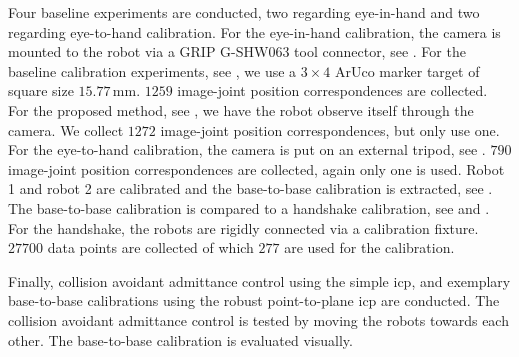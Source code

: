 Four baseline experiments are conducted, two regarding eye-in-hand and two regarding eye-to-hand calibration. For the eye-in-hand calibration, the camera is mounted to the robot via a GRIP G-SHW063 tool connector, see . For the baseline calibration experiments, see , we use a $3\times4$ ArUco marker target of square size $15.77\,\text{mm}$. $1259$ image-joint position correspondences are collected. For the proposed method, see , we have the robot observe itself through the camera. We collect $1272$ image-joint position correspondences, but only use one. For the eye-to-hand calibration, the camera is put on an external tripod, see . $790$ image-joint position correspondences are collected, again only one is used. Robot 1 and robot 2 are calibrated and the base-to-base calibration is extracted, see . The base-to-base calibration is compared to a handshake calibration, see  and . For the handshake, the robots are rigidly connected via a calibration fixture. $27700$ data points are collected of which $277$ are used for the calibration.

Finally, collision avoidant admittance control using the simple \gls{icp}, and exemplary base-to-base calibrations using the robust point-to-plane \gls{icp} are conducted. The collision avoidant admittance control is tested by moving the robots towards each other. The base-to-base calibration is evaluated visually.

